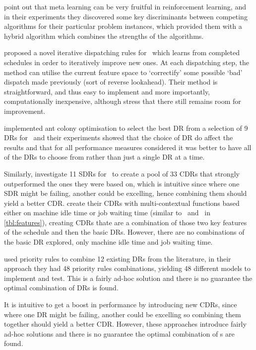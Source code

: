 \citet{Kalyanakrishnan11} point out that meta learning can be very fruitful in 
reinforcement learning, and in their experiments they discovered some key 
discriminants between competing algorithms for their particular problem 
instances, which provided them with a hybrid algorithm which combines the 
strengths of the algorithms.

\citet{Nguyen13} proposed a novel {iterative dispatching rules} for \JSP\ 
which learns from completed schedules in order to iteratively improve new ones. 
At each dispatching step, the method can utilise the current feature space to 
`correctify' some possible `bad' dispatch made previously (sort of reverse 
lookahead). Their method is straightforward, and thus easy to implement and 
more importantly, computationally inexpensive, although \citeauthor{Nguyen13} 
stress that there still remains room for improvement. 

\citet{Korytkowski13} implemented {ant colony optimisation} to select the 
best DR from a selection of 9 DRs for \JSP\ and their experiments showed 
that the choice of DR do affect the results and that for all performance 
measures considered it was better to have all of the DRs to choose from rather 
than just a single DR at a time. 

Similarly, \citet{Lu13} investigate 11 SDRs for \JSP\ to create a pool of 
33 CDRs that strongly outperformed the ones they were based on, which 
is intuitive since where one SDR might be failing, another could be excelling, 
hence combining them should yield a better CDR. \citeauthor{Lu13} create their 
CDRs with {multi-contextual functions} based either on machine idle time 
or job waiting time (similar to \phiwait\ and \phimacSlack\ in 
\cref{tbl:features}), creating CDRs thate are a combination of those 
two key features of the schedule and then the basic DRs. However, there are no 
combinations of the basic DR explored, only machine idle time and job waiting 
time.  

\citet{Yu13} used priority rules to combine 12 existing DRs from the 
literature, in their approach they had 48 priority rules combinations, 
yielding 48 different models to implement and test. This is a fairly 
ad-hoc solution and there is no guarantee the optimal combination of DRs is 
found. 

It is intuitive to get a boost in performance by introducing new CDRs, since 
where one DR might be failing, another could be excelling so combining them 
together should yield a better CDR. However, these approaches introduce fairly 
ad-hoc solutions and there is no guarantee the optimal combination of 
\dr s are found.

